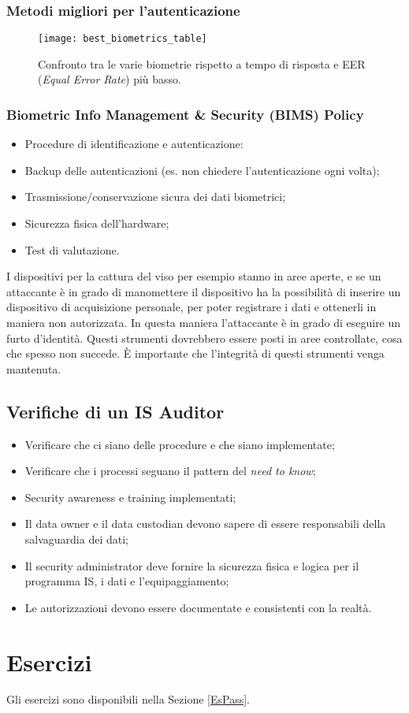 \subsubsection{Metodi migliori per l'autenticazione}

\begin{figure}[H]
 \centering
 \texttt{[image: best\_biometrics\_table]}
 \caption{Confronto tra le varie biometrie rispetto a tempo di risposta e EER
(\emph{Equal Error Rate}) più basso. }
\end{figure}


\subsubsection{Biometric Info Management \& Security (BIMS) Policy}

\begin{itemize}
 \item Procedure di identificazione e autenticazione:
 \item Backup delle autenticazioni (es. non chiedere l'autenticazione ogni
 volta);
 \item Trasmissione/conservazione sicura dei dati biometrici;
 \item Sicurezza fisica dell'hardware;
 \item Test di valutazione.
\end{itemize}

I dispositivi per la cattura del viso per esempio stanno in aree aperte, e se
un attaccante è in grado di manomettere il dispositivo ha la possibilità di
inserire un dispositivo di acquisizione personale, per poter registrare i dati
e ottenerli in maniera non autorizzata. In questa maniera l'attaccante è in
grado di eseguire un furto d'identità. Questi strumenti dovrebbero essere posti
in aree controllate, cosa che spesso non succede. È importante che l'integrità
di questi strumenti venga mantenuta.

\subsection{Verifiche di un IS Auditor}
\begin{itemize}
 \item Verificare che ci siano delle procedure e che siano implementate;
 \item Verificare che i processi seguano il pattern del \textit{need to know};
 \item Security awareness e training implementati;
 \item Il data owner e il data custodian devono sapere di essere responsabili
 della salvaguardia dei dati;
 \item Il security administrator deve fornire la sicurezza fisica e logica per
 il programma IS, i dati e l'equipaggiamento;
 \item Le autorizzazioni devono essere documentate e consistenti con la realtà.
\end{itemize}


\section{Esercizi}

Gli esercizi sono disponibili nella Sezione \ref{EsPass}.
